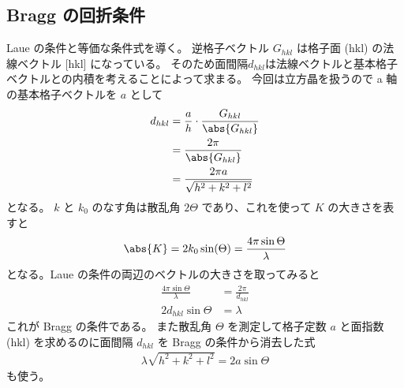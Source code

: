 \documentclass[11pt,dvipdfmx,a4paper]{jsarticle}
\begin{document}
\subsection{Bragg の回折条件}
 Laue の条件と等価な条件式を導く。
逆格子ベクトル \(G_{hkl}\) は格子面 (hkl) の法線ベクトル [hkl] になっている。
そのため面間隔\(d_{hkl}\)は法線ベクトルと基本格子ベクトルとの内積を考えることによって求まる。
今回は立方晶を扱うので a 軸の基本格子ベクトルを \(a\) として
\begin{align}
	d_{hkl} &= \frac{a}{h} \cdot \frac{G_{hkl}}{\abs{G_{hkl}}}\\
	&= \frac{2\pi}{\abs{G_{hkl}}} \label{eq:d-G}\\
	&= \frac{2\pi a}{\sqrt{h^2+k^2+l^2}}
\end{align}
となる。
\(k\) と \(k_0\) のなす角は散乱角 \(2\Theta\) であり、これを使って \(K\) の大きさを表すと
\begin{align}
	\abs{K} = 2k_0\sin(\Theta) = \frac{4\pi\sin\Theta}{\lambda}
\end{align}
となる。Laue の条件の両辺のベクトルの大きさを取ってみると
\begin{align}
	\frac{4\pi\sin\Theta}{\lambda} &= \frac{2\pi}{d_{hkl}}\\
	2d_{hkl} \sin\Theta &= \lambda
\end{align}
これが Bragg の条件である。
また散乱角 \(\Theta\) を測定して格子定数 \(a\) と面指数 (hkl) を求めるのに面間隔 \(d_{hkl}\) を Bragg の条件から消去した式
\begin{align}
	\lambda \sqrt{h^2+k^2+l^2}  = 2a \sin\Theta \label{eq:bragg}
\end{align}
も使う。
\end{document}
